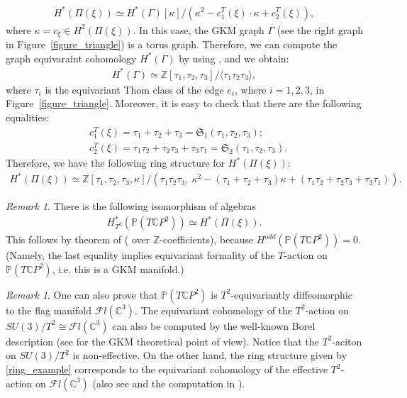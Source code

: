 \documentclass[12pt]{amsart}
\theoremstyle{definition}
\theoremstyle{remark}
\newtheorem{remark}[theorem]{Remark}
\numberwithin{equation}{section}
\newcommand{\Z}{{\mathbb{Z}}}
\renewcommand{\P}{{\mathbb{P}}}
\begin{document}
\begin{align*}
H^{*}(\Pi(\xi))\simeq H^{*}(\Gamma)[\kappa]/\left( \kappa^{2}
-c_{1}^{T}(\xi)\cdot \kappa
+c_{2}^{T}(\xi) \right),
\end{align*}
where $\kappa=c_{\xi}\in H^{2}(\Pi(\xi))$.
In this case,
the GKM graph $\Gamma$ (see the right graph in Figure~\ref{figure_triangle}) is a torus graph.
Therefore, we can compute the graph equivaraint cohomology $H^{*}(\Gamma)$ by using \cite{MMP}, and we obtain:
\begin{align*}
H^{*}(\Gamma)\simeq \mathbb{Z}[\tau_{1},\tau_{2},\tau_{3}]/\langle \tau_{1}\tau_{2}\tau_{3} \rangle,
\end{align*}
where $\tau_{i}$ is the equivariant Thom class of the edge $e_{i}$, where $i=1,2,3$, in Figure~\ref{figure_triangle}.
Moreover, it is easy to check that there are the following equalities:
\begin{align*}
& c_{1}^{T}(\xi)=\tau_{1}+\tau_{2}+\tau_{3}=\mathfrak{S}_{1}(\tau_{1},\tau_{2},\tau_{3}); \\
& c_{2}^{T}(\xi)=\tau_{1}\tau_{2}+\tau_{2}\tau_{3}+\tau_{3}\tau_{1}=\mathfrak{S}_{2}(\tau_{1},\tau_{2},\tau_{3}).
\end{align*}
Therefore, we have the following ring structure for $H^{*}(\Pi(\xi))$:
\begin{align}
\label{ring_example}
H^{*}(\Pi(\xi))\simeq \mathbb{Z}[\tau_{1},\tau_{2},\tau_{3},\kappa]/\left(\tau_{1}\tau_{2}\tau_{3},\ \kappa^{2}-(\tau_{1}+\tau_{2}+\tau_{3})\kappa+(\tau_{1}\tau_{2}+\tau_{2}\tau_{3}+\tau_{3}\tau_{1}) \right).
\end{align}

\begin{remark}
There is the following isomorphism of algebras
\begin{align*}
H_{T^{2}}^{*}(\P(T\mathbb{C}P^{2}))\simeq H^{*}(\Pi(\xi)).
\end{align*}
This follows by theorem of \cite{GKM} (\cite{FP} over $\Z$-coefficients), because $H^{odd}(\P(T\mathbb{C} P^2))=0$.
(Namely, the last equality implies equivariant formality of the $T$-action on $\P(T\mathbb{C} P^2)$, i.e. this is a GKM manifold.)
\end{remark}

\begin{remark}
One can also prove that $\P(T\mathbb{C}P^{2})$ is $T^{2}$-equivariantly diffeomorphic to the flag manifold $\mathcal{F}l(\mathbb{C}^{3})$.
The equivariant cohomology of the $T^{2}$-action on $SU(3)/T^{2}\cong \mathcal{F}l(\mathbb{C}^{3})$ can also be computed by the well-known Borel description (see \cite{FIM} for the GKM theoretical point of view).
Notice that the $T^{2}$-aciton on $SU(3)/T^{2}$ is non-effective.
On the other hand, the ring structure given by \eqref{ring_example} corresponds to
the equivariant cohomology of the effective $T^{2}$-action on $\mathcal{F}l(\mathbb{C}^{3})$ (also see \cite[Remark 4.5]{KKLS} and the computation in \cite{KLSS}).
\end{remark}
\end{document}
